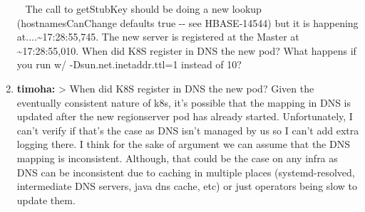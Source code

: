 \documentclass{report}%
\begin{document}
\begin{enumerate}
\begin{lstlisting}
\end{lstlisting} \ \newline%
\newline%
\newline%
\newline%
The call to getStubKey should be doing a new lookup (hostnamesCanChange defaults true {-}{-} see  HBASE{-}14544) but it is happening at....\textasciitilde{}17:28:55,745.\newline%
\newline%
\newline%
\newline%
The new server is registered at the Master at \textasciitilde{}17:28:55,010.\newline%
\newline%
\newline%
\newline%
When did K8S register in DNS the new pod?\newline%
\newline%
\newline%
\newline%
What happens if you run w/  {-}Dsun.net.inetaddr.ttl=1 instead of 10?\newline%
\newline%
\newline%
\newline%
\newline%
\newline%
\newline%
\newline%
\newline%
\newline%
\newline%
\newline%
%
\item%
\textbf{timoha: }> When did K8S register in DNS the new pod?\newline%
\newline%
\newline%
\newline%
Given the eventually consistent nature of k8s, it's possible that the mapping in DNS is updated after the new regionserver pod has already started. Unfortunately, I can't verify if that's the case as DNS isn't managed by us so I can't add extra logging there. I think for the sake of argument we can assume that the DNS mapping is inconsistent. Although, that could be the case on any infra as DNS can be inconsistent due to caching in multiple places (systemd{-}resolved, intermediate DNS servers, java dns cache, etc) or just operators being slow to update them.\newline%

\end{enumerate}
\end{document}
